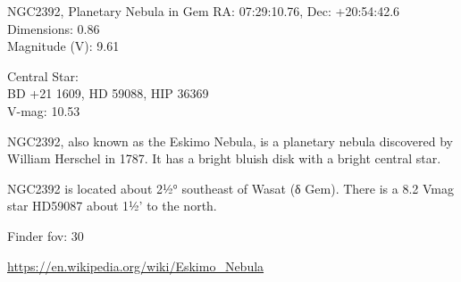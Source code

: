 \begin{block}{NGC2392, Planetary Nebula in Gem}
    RA: 07:29:10.76, Dec: +20:54:42.6 \\ 
    Dimensions: 0.86 \\ 
    Magnitude (V): 9.61

    Central Star: \\ 
      \hspace{1em}BD +21 1609, HD 59088, HIP 36369 \\ 
      \hspace{1em}V-mag: 10.53

    NGC2392, also known as the Eskimo Nebula, is a planetary nebula discovered
    by William Herschel in 1787. It has a bright bluish disk with a bright
    central star.

    NGC2392 is located about 2½° southeast of Wasat (δ Gem). There is a 8.2 Vmag
    star HD59087 about 1½' to the north.
    
    Finder fov: 30 

    \url{https://en.wikipedia.org/wiki/Eskimo_Nebula} 
\end{block}